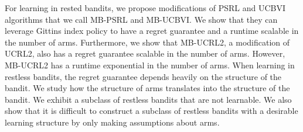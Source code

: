 For learning in rested bandits, we propose modifications of PSRL and UCBVI algorithms that we call MB-PSRL and MB-UCBVI.
We show that they can leverage Gittins index policy to have a regret guarantee and a runtime scalable in the number of arms.
Furthermore, we show that MB-UCRL2, a modification of UCRL2, also has a regret guarantee scalable in the number of arms.
However, MB-UCRL2 has a runtime exponential in the number of arms.
When learning in restless bandits, the regret guarantee depends heavily on the structure of the bandit.
We study how the structure of arms translates into the structure of the bandit.
We exhibit a subclass of restless bandits that are not learnable.
We also show that it is difficult to construct a subclass of restless bandits with a desirable learning structure by only making assumptions about arms.
